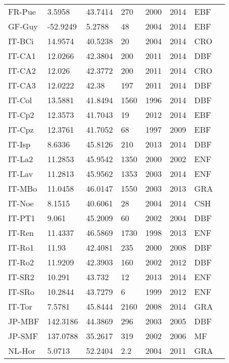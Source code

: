 \documentclass[a4paper, 12pt]{article}
\begin{document}
\begin{longtable}{l l l l l l l l}
FR-Pue & 3.5958 & 43.7414 & 270 & 2000 & 2014 & EBF & \cite{FR-Pue} \\ 
GF-Guy & -52.9249 & 5.2788 & 48 & 2004 & 2014 & EBF & \cite{GF-Guy} \\ 
IT-BCi & 14.9574 & 40.5238 & 20 & 2004 & 2014 & CRO & \cite{IT-BCi} \\ 
IT-CA1 & 12.0266 & 42.3804 & 200 & 2011 & 2014 & DBF & \cite{IT-CA1} \\ 
IT-CA2 & 12.026 & 42.3772 & 200 & 2011 & 2014 & CRO & \cite{IT-CA2} \\ 
IT-CA3 & 12.0222 & 42.38 & 197 & 2011 & 2014 & DBF & \cite{IT-CA3} \\ 
IT-Col & 13.5881 & 41.8494 & 1560 & 1996 & 2014 & DBF & \cite{IT-Col} \\ 
IT-Cp2 & 12.3573 & 41.7043 & 19 & 2012 & 2014 & EBF & \cite{IT-Cp2} \\ 
IT-Cpz & 12.3761 & 41.7052 & 68 & 1997 & 2009 & EBF & \cite{IT-Cpz} \\ 
IT-Isp & 8.6336 & 45.8126 & 210 & 2013 & 2014 & DBF & \cite{IT-Isp} \\ 
IT-La2 & 11.2853 & 45.9542 & 1350 & 2000 & 2002 & ENF & \cite{IT-La2} \\ 
IT-Lav & 11.2813 & 45.9562 & 1353 & 2003 & 2014 & ENF & \cite{IT-Lav} \\ 
IT-MBo & 11.0458 & 46.0147 & 1550 & 2003 & 2013 & GRA & \cite{IT-MBo} \\ 
IT-Noe & 8.1515 & 40.6061 & 28 & 2004 & 2014 & CSH & \cite{IT-Noe} \\ 
IT-PT1 & 9.061 & 45.2009 & 60 & 2002 & 2004 & DBF & \cite{IT-PT1} \\ 
IT-Ren & 11.4337 & 46.5869 & 1730 & 1998 & 2013 & ENF & \cite{IT-Ren} \\ 
IT-Ro1 & 11.93 & 42.4081 & 235 & 2000 & 2008 & DBF & \cite{IT-Ro1} \\ 
IT-Ro2 & 11.9209 & 42.3903 & 160 & 2002 & 2012 & DBF & \cite{IT-Ro2} \\ 
IT-SR2 & 10.291 & 43.732 & 12 & 2013 & 2014 & ENF & \cite{IT-SR2} \\ 
IT-SRo & 10.2844 & 43.7279 & 6 & 1999 & 2012 & ENF & \cite{IT-SRo} \\ 
IT-Tor & 7.5781 & 45.8444 & 2160 & 2008 & 2014 & GRA & \cite{IT-Tor} \\ 
JP-MBF & 142.3186 & 44.3869 & 296 & 2003 & 2005 & DBF & \cite{JP-MBF} \\ 
JP-SMF & 137.0788 & 35.2617 & 319 & 2002 & 2006 & MF & \cite{JP-SMF} \\ 
NL-Hor & 5.0713 & 52.2404 & 2.2 & 2004 & 2011 & GRA & \cite{NL-Hor} \\ 

\end{longtable}
\end{document}

